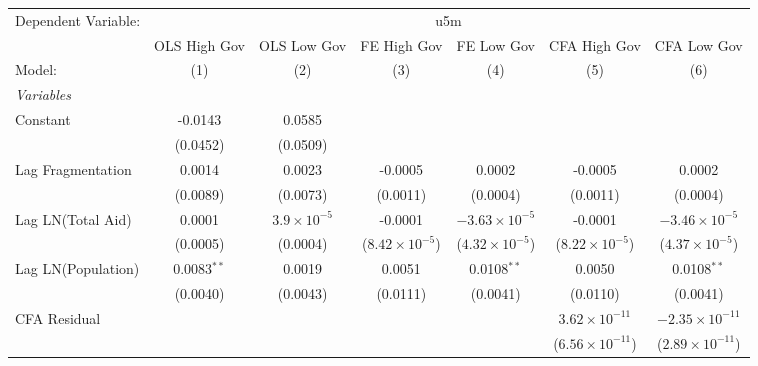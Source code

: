 \begingroup
\centering
\begin{tabular}{lcccccc}
   \tabularnewline \midrule \midrule
   Dependent Variable: & \multicolumn{6}{c}{u5m}\\
                      & OLS High Gov  & OLS Low Gov          & FE High Gov             & FE Low Gov              & CFA High Gov             & CFA Low Gov \\   
   Model:             & (1)           & (2)                  & (3)                     & (4)                     & (5)                      & (6)\\  
   \midrule
   \emph{Variables}\\
   Constant           & -0.0143       & 0.0585               &                         &                         &                          &   \\   
                      & (0.0452)      & (0.0509)             &                         &                         &                          &   \\   
   Lag Fragmentation  & 0.0014        & 0.0023               & -0.0005                 & 0.0002                  & -0.0005                  & 0.0002\\   
                      & (0.0089)      & (0.0073)             & (0.0011)                & (0.0004)                & (0.0011)                 & (0.0004)\\   
   Lag LN(Total Aid)  & 0.0001        & $3.9\times 10^{-5}$  & -0.0001                 & $-3.63\times 10^{-5}$   & -0.0001                  & $-3.46\times 10^{-5}$\\    
                      & (0.0005)      & (0.0004)             & ($8.42\times 10^{-5}$)  & ($4.32\times 10^{-5}$)  & ($8.22\times 10^{-5}$)   & ($4.37\times 10^{-5}$)\\    
   Lag LN(Population) & 0.0083$^{**}$ & 0.0019               & 0.0051                  & 0.0108$^{**}$           & 0.0050                   & 0.0108$^{**}$\\   
                      & (0.0040)      & (0.0043)             & (0.0111)                & (0.0041)                & (0.0110)                 & (0.0041)\\   
   CFA Residual       &               &                      &                         &                         & $3.62\times 10^{-11}$    & $-2.35\times 10^{-11}$\\    
                      &               &                      &                         &                         & ($6.56\times 10^{-11}$)  & ($2.89\times 10^{-11}$)\\    

\end{tabular}
